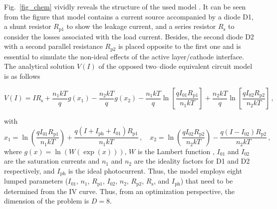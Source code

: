 \documentclass[a4paper,fleqn]{cas-sc}
\begin{document}
Fig.~\ref{fig_chem}
vividly reveals the structure of the used model \cite{Castro2010}.
It can be seen from the figure that model contains a current source accompanied by a diode D1, a shunt
resistor $R_\mathrm{p1}$ to show the leakage current, and a series resistor $R_\mathrm{s}$ to consider the
losses associated with the load current.
Besides, the second diode D2 with a second parallel resistance $R_\mathrm{p2}$ is placed opposite to the first one and is essential to
simulate the non-ideal effects of the active layer/cathode interface.
The analytical solution $V(I)$ of the opposed two--diode equivalent circuit model
is as follows \cite{CastroSolution,roberts2015calculating}

\begin{equation}
\label{eqIV_g}
V(I)= IR_\mathrm{s}+\frac{n_1kT}{q}g(x_1)-\frac{n_2kT}{q}g(x_2)
  -\frac{n_1kT}{q}\ln\left[\frac{qI_{01}R_\mathrm{p1}}{n_1kT}\right] +\frac{n_2kT}{q}\ln\left[\frac{qI_{02}R_\mathrm{p2}}{n_2kT}\right]\,,
\end{equation}

with
\begin{equation}
\label{eqx2}
x_1= \ln\left(\frac{qI_{01}R_\mathrm{p1}}{n_1kT}\right)+\frac{q(I+I_\mathrm{ph}+I_{01})R_\mathrm{p1}}{n_1kT}\,,\quad
x_2= \ln\left(\frac{qI_{02}R_\mathrm{p2}}{n_2kT}\right)-\frac{q(I-I_{02})R_\mathrm{p2}}{n_2kT}\,,
\end{equation}
where
$g(x)=\ln(W(\exp(x)))$,
$W$ is the Lambert function \cite{LambertNew},
$I_{01}$ and $I_{02}$ are the saturation currents and
$n_1$ and $n_2$ are
the ideality factors for D1 and D2 respectively,
and $I_\mathrm{ph}$ is the ideal photocurrent.
Thus, the model employs eight lumped parameters
($I_{01}$, $n_1$, $R_\mathrm{p1}$, $I_{02}$, $n_2$, $R_\mathrm{p2}$,
$R_\mathrm{s}$, and $I_\mathrm{ph}$)
that need to be determined from the IV curve.
Thus, from an optimization perspective, the dimension of the problem is $D=8$.
\end{document}
